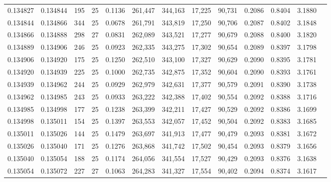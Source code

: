 \begin{tabular}{rrrrrrrrrrrrr}
0.134827 & 0.134844 &   195 &  25 &                                     0.1136 & 261,447 & 344,163 &  17,225 &  90,731 & 0.2086 & 0.8404 & 3.1880 \\
0.134844 & 0.134866 &   344 &  25 &                                     0.0678 & 261,791 & 343,819 &  17,250 &  90,706 & 0.2087 & 0.8402 & 3.1848 \\
0.134866 & 0.134888 &   298 &  27 &                                     0.0831 & 262,089 & 343,521 &  17,277 &  90,679 & 0.2088 & 0.8400 & 3.1820 \\
0.134889 & 0.134906 &   246 &  25 &                                     0.0923 & 262,335 & 343,275 &  17,302 &  90,654 & 0.2089 & 0.8397 & 3.1798 \\
0.134906 & 0.134920 &   175 &  25 &                                     0.1250 & 262,510 & 343,100 &  17,327 &  90,629 & 0.2090 & 0.8395 & 3.1781 \\
0.134920 & 0.134939 &   225 &  25 &                                     0.1000 & 262,735 & 342,875 &  17,352 &  90,604 & 0.2090 & 0.8393 & 3.1761 \\
0.134939 & 0.134962 &   244 &  25 &                                     0.0929 & 262,979 & 342,631 &  17,377 &  90,579 & 0.2091 & 0.8390 & 3.1738 \\
0.134962 & 0.134985 &   243 &  25 &                                     0.0933 & 263,222 & 342,388 &  17,402 &  90,554 & 0.2092 & 0.8388 & 3.1716 \\
0.134985 & 0.134998 &   177 &  25 &                                     0.1238 & 263,399 & 342,211 &  17,427 &  90,529 & 0.2092 & 0.8386 & 3.1699 \\
0.134998 & 0.135011 &   154 &  25 &                                     0.1397 & 263,553 & 342,057 &  17,452 &  90,504 & 0.2092 & 0.8383 & 3.1685 \\
0.135011 & 0.135026 &   144 &  25 &                                     0.1479 & 263,697 & 341,913 &  17,477 &  90,479 & 0.2093 & 0.8381 & 3.1672 \\
0.135026 & 0.135040 &   171 &  25 &                                     0.1276 & 263,868 & 341,742 &  17,502 &  90,454 & 0.2093 & 0.8379 & 3.1656 \\
0.135040 & 0.135054 &   188 &  25 &                                     0.1174 & 264,056 & 341,554 &  17,527 &  90,429 & 0.2093 & 0.8376 & 3.1638 \\
0.135054 & 0.135072 &   227 &  27 &                                     0.1063 & 264,283 & 341,327 &  17,554 &  90,402 & 0.2094 & 0.8374 & 3.1617 \\

\end{tabular}
